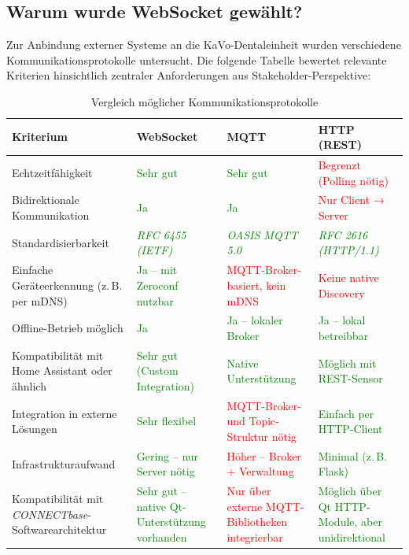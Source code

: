 \subsection*{Warum wurde WebSocket gewählt?}

Zur Anbindung externer Systeme an die KaVo-Dentaleinheit wurden verschiedene Kommunikationsprotokolle untersucht. Die folgende Tabelle bewertet relevante Kriterien hinsichtlich zentraler Anforderungen aus Stakeholder-Perspektive:


\begin{table}[H]
\centering
\caption{Vergleich möglicher Kommunikationsprotokolle}
\label{tab:kommunikationsvergleich}
\renewcommand{\arraystretch}{1.5}
\begin{tabularx}{\textwidth}{|Y|Y|Y|Y|}
\hline
\textbf{Kriterium} & \textbf{WebSocket} & \textbf{MQTT} & \textbf{HTTP (REST)} \\
\hline
Echtzeitfähigkeit &
\textcolor{green}{Sehr gut} &
\textcolor{green}{Sehr gut} &
\textcolor{red}{Begrenzt (Polling nötig)} \\
\hline
Bidirektionale Kommunikation &
\textcolor{green}{Ja} &
\textcolor{green}{Ja} &
\textcolor{red}{Nur Client → Server} \\
\hline
Standardisierbarkeit &
\textcolor{green}{\textit{RFC 6455 (IETF)}} &
\textcolor{green}{\textit{OASIS MQTT 5.0}} &
\textcolor{green}{\textit{RFC 2616 (HTTP/1.1)}} \\
\hline
Einfache Geräteerkennung (z.\,B. per mDNS) &
\textcolor{green}{Ja – mit Zeroconf nutzbar} &
\textcolor{red}{MQTT-Broker-basiert, kein mDNS} &
\textcolor{red}{Keine native Discovery} \\
\hline
Offline-Betrieb möglich &
\textcolor{green}{Ja} &
\textcolor{green}{Ja – lokaler Broker} &
\textcolor{green}{Ja – lokal betreibbar} \\
\hline
Kompatibilität mit Home Assistant oder ähnlich &
\textcolor{green}{Sehr gut (Custom Integration)} &
\textcolor{green}{Native Unterstützung} &
\textcolor{green}{Möglich mit REST-Sensor} \\
\hline
Integration in externe Lösungen &
\textcolor{green}{Sehr flexibel} &
\textcolor{red}{MQTT-Broker- und Topic-Struktur nötig} &
\textcolor{green}{Einfach per HTTP-Client} \\
\hline
Infrastrukturaufwand &
\textcolor{green}{Gering – nur Server nötig} &
\textcolor{red}{Höher – Broker + Verwaltung} &
\textcolor{green}{Minimal (z.\,B. Flask)} \\
\hline
Kompatibilität mit \textit{CONNECTbase}-Softwarearchitektur &
\textcolor{green}{Sehr gut – native Qt-Unterstützung vorhanden} &
\textcolor{red}{Nur über externe MQTT-Bibliotheken integrierbar} &
\textcolor{green}{Möglich über Qt HTTP-Module, aber unidirektional} \\
\hline
\end{tabularx}
\end{table}
